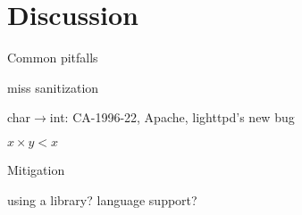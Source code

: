 \section{Discussion}
\label{s:disc}

Common pitfalls

miss sanitization

char$\to$int: 
CA-1996-22,
Apache,
lighttpd's new bug

$x \times y < x$

Mitigation

using a library? language support?
